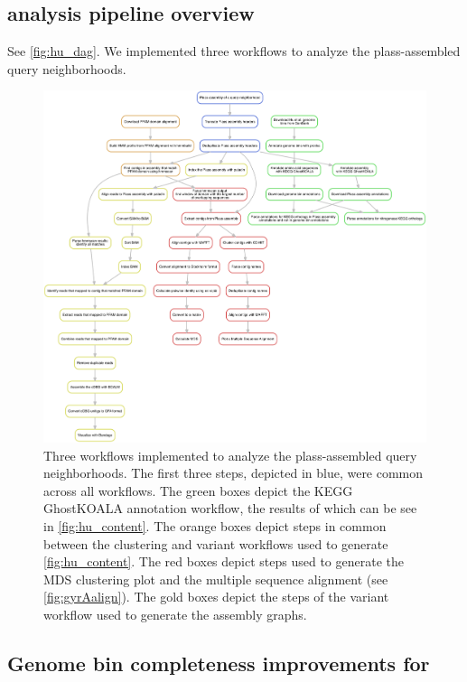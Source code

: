 \subsection{\hu analysis pipeline overview}


See \autoref{fig:hu_dag}. We implemented three workflows to analyze the
plass-assembled \hu query neighborhoods.


\begin{figure}
 \centering
 \includegraphics[width=\linewidth]{hu_dag}
	\caption{Three workflows implemented to analyze the plass-assembled
\hu query neighborhoods. The first three steps, depicted in blue, were common
across all workflows. The green boxes depict the KEGG GhostKOALA annotation
workflow, the results of which can be see in \autoref{fig:hu_content}.
The orange boxes depict steps in common between the clustering and variant
workflows used to generate \autoref{fig:hu_content}. The red boxes depict
steps used to generate the MDS clustering plot and the multiple sequence
alignment (see \autoref{fig:gyrAalign}). The gold boxes depict the
steps of the variant workflow used to generate the assembly graphs.
}
 \label{fig:hu_dag}
\end{figure}

\subsection{Genome bin completeness improvements for \hu}
\label{subsec:checkm}


